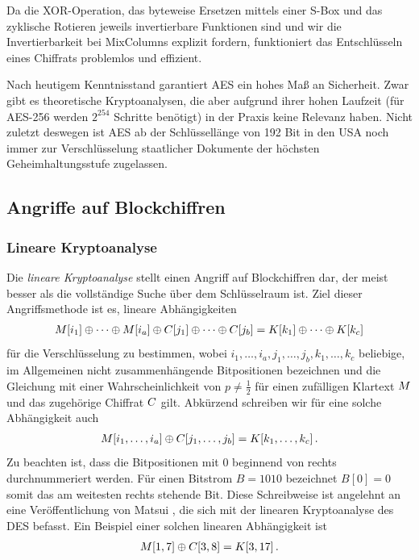 Da die XOR-Operation, das byteweise Ersetzen mittels einer S-Box und das
zyklische Rotieren jeweils invertierbare Funktionen sind und wir die
Invertierbarkeit bei MixColumns explizit fordern, funktioniert das
Entschlüsseln eines Chiffrats problemlos und effizient. 

Nach heutigem Kenntnisstand garantiert AES ein hohes Maß an
Sicherheit. Zwar gibt es theoretische Kryptoanalysen, die aber aufgrund
ihrer hohen Laufzeit (für AES-256 werden $2^{254}$ Schritte benötigt) in
der Praxis keine Relevanz haben. Nicht zuletzt deswegen ist AES ab der
Schlüssellänge von 192 Bit in den USA noch immer zur Verschlüsselung
staatlicher Dokumente der höchsten Geheimhaltungsstufe zugelassen. 

\subsection{Angriffe auf Blockchiffren}
\subsubsection{Lineare Kryptoanalyse}\label{sssec:linKryptoanalyse}
Die \emph{lineare Kryptoanalyse}\indexLinCrypt  \: stellt einen Angriff auf
Blockchiffren dar, der meist besser als die vollständige Suche über dem
Schlüsselraum ist. Ziel dieser Angriffsmethode ist es, lineare
Abhängigkeiten 
\begin{align}\label{approx}
  M[i_{1}] \oplus \dots \oplus M[i_{a}] \oplus C[j_{1}] \oplus \dots \oplus C[j_{b}] = K[k_{1}] \oplus \dots \oplus K[k_{c}]
\end{align}
für die Verschlüsselung zu bestimmen, wobei
$i_{1},\dots,i_{a},j_{1},\dots,j_{b},k_{1},\dots,k_{c}$ beliebige, im
Allgemeinen nicht zusammenhängende Bitpositionen bezeichnen und die
Gleichung mit einer Wahrscheinlichkeit von $p \neq \frac{1}{2}$ für
einen zufälligen Klartext $M$ und das zugehörige Chiffrat
$C$ gilt. Abkürzend schreiben wir für eine solche Abhängigkeit
auch 
\begin{align*}
  M[i_{1},\dots,i_{a}] \oplus C[j_{1},\dots,j_{b}] = K[k_{1},\dots,k_{c}]\, .
\end{align*}
Zu beachten ist, dass die Bitpositionen mit $0$ beginnend von rechts
durchnummeriert werden. 
\label{matsui-notation}Für einen Bitstrom $B = 1010$ bezeichnet $B[0] =
0$ somit das am weitesten rechts stehende Bit. Diese Schreibweise ist
angelehnt an eine Veröffentlichung von Matsui \cite{Matsui1994}, die
sich mit der linearen Kryptoanalyse des DES befasst. 
Ein Beispiel einer solchen linearen Abhängigkeit ist
\begin{align*}
  M[1, 7] \oplus C[3, 8] = K[3, 17]\, .
\end{align*}

